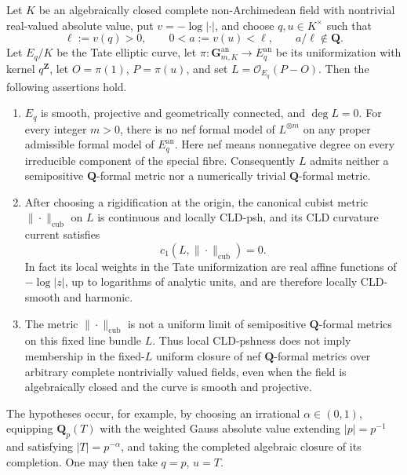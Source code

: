 \begin{theorem}
\label{thm:p081-irrational-tate-period-obstruction}
Let $K$ be an algebraically closed complete non-Archimedean field with
nontrivial real-valued absolute value, put $v=-\log|\cdot|$, and choose
$q,u\in K^\times$ such that
\[
  \ell:=v(q)>0,\qquad 0<a:=v(u)<\ell,
  \qquad a/\ell\notin\mathbf Q.
\]
Let $E_q/K$ be the Tate elliptic curve, let
$\pi:\mathbf G_{m,K}^{\mathrm{an}}\to E_q^{\mathrm{an}}$
be its uniformization with kernel $q^{\mathbf Z}$, let
$O=\pi(1)$, $P=\pi(u)$, and set
$L=\mathcal O_{E_q}(P-O)$.
Then the following assertions hold.
\begin{enumerate}
\item
$E_q$ is smooth, projective and geometrically connected, and $\deg L=0$.
For every integer $m>0$, there is no nef formal model of
$L^{\otimes m}$ on any proper admissible formal model of
$E_q^{\mathrm{an}}$. Here nef means nonnegative degree on every
irreducible component of the special fibre.
Consequently $L$ admits neither a semipositive
$\mathbf Q$-formal metric nor a numerically trivial
$\mathbf Q$-formal metric.
\item
After choosing a rigidification at the origin, the canonical cubist
metric $\|\cdot\|_{\mathrm{cub}}$ on $L$ is continuous and locally
CLD-psh, and its CLD curvature current satisfies
\[
 c_1(L,\|\cdot\|_{\mathrm{cub}})=0.
\]
In fact its local weights in the Tate uniformization are real affine
functions of $-\log|z|$, up to logarithms of analytic units, and are
therefore locally CLD-smooth and harmonic.
\item
The metric $\|\cdot\|_{\mathrm{cub}}$ is not a uniform limit of
semipositive $\mathbf Q$-formal metrics on this fixed line bundle
$L$. Thus local CLD-pshness does not imply membership in the
fixed-$L$ uniform closure of nef $\mathbf Q$-formal metrics over
arbitrary complete nontrivially valued fields, even when the field is
algebraically closed and the curve is smooth and projective.
\end{enumerate}
The hypotheses occur, for example, by choosing an irrational
$\alpha\in(0,1)$, equipping $\mathbf Q_p(T)$ with the weighted
Gauss absolute value extending $|p|=p^{-1}$ and satisfying
$|T|=p^{-\alpha}$, and taking the completed algebraic closure of its
completion. One may then take $q=p$, $u=T$.
\end{theorem}
